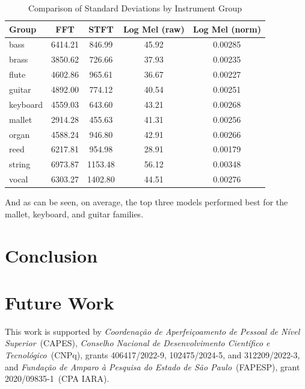 \documentclass[sigconf,natbib=false]{acmart}
\begin{document}
\begin{table}
  \caption{Comparison of Standard Deviations by Instrument Group}
  \label{tab:std_by_group}
  \begin{tabular}{lcccc}
    \toprule
    Group & FFT & STFT & Log Mel (raw) & Log Mel (norm) \\
    \midrule
    bass     & 6414.21 & 846.99  & 45.92 & 0.00285 \\
    brass    & 3850.62 & 726.66  & 37.93 & 0.00235 \\
    flute    & 4602.86 & 965.61  & 36.67 & 0.00227 \\
    guitar   & 4892.00 & 774.12  & 40.54 & 0.00251 \\
    keyboard & 4559.03 & 643.60  & 43.21 & 0.00268 \\
    mallet   & 2914.28 & 455.63  & 41.31 & 0.00256 \\
    organ    & 4588.24 & 946.80  & 42.91 & 0.00266 \\
    reed     & 6217.81 & 954.98  & 28.91 & 0.00179 \\
    string   & 6973.87 & 1153.48 & 56.12 & 0.00348 \\
    vocal    & 6303.27 & 1402.80 & 44.51 & 0.00276 \\
    \bottomrule
  \end{tabular}
\end{table}

And as can be seen, on average, the top three models performed best for the mallet, keyboard, and guitar families.

\section{Conclusion}

\section{Future Work}

\begin{acks}
This work is supported by \textit{Coordenação de Aperfeiçoamento de Pessoal de Nível Superior}~(CAPES), \textit{Conselho Nacional de Desenvolvimento Científico e Tecnológico}~(CNPq), grants 406417/2022-9, 102475/2024-5, and 312209/2022-3, and \textit{Fundação de Amparo à Pesquisa do Estado de São Paulo}~(FAPESP), grant 2020/09835-1~(CPA IARA). 
\end{acks}


\printbibliography
\end{document}
